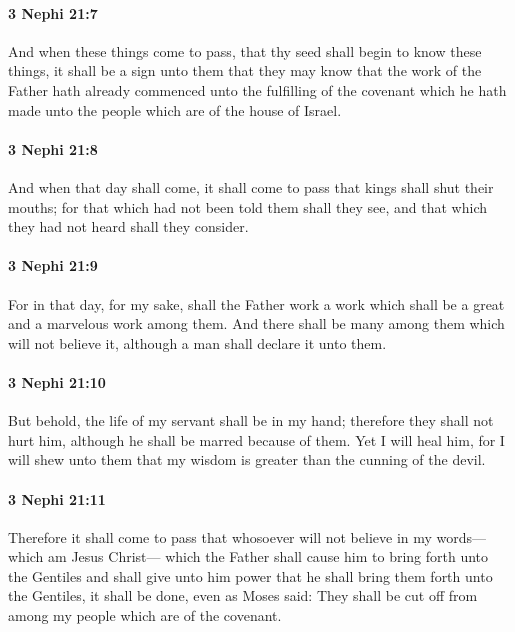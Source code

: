 		\paragraph{3 Nephi 21:7} %
			\label{3NEPHI-21-7}

			And when these things come to pass,
			that thy seed shall begin to know these things,
			it shall be a sign unto them
			that they may know that the work of the Father hath already commenced
			unto the fulfilling of the covenant which he hath made unto the people
			which are of the house of Israel.

		\paragraph{3 Nephi 21:8} %
			\label{3NEPHI-21-8}

			And when that day shall come,
			it shall come to pass that kings shall shut their mouths;
			for that which had not been told them shall they see,
			and that which they had not heard shall they consider.

		\paragraph{3 Nephi 21:9} %
			\label{3NEPHI-21-9}

			For in that day, for my sake, shall the Father work a work
			which shall be a great and a marvelous work among them.
			And there shall be many among them which will not believe it,
			although a man shall declare it unto them.

		\paragraph{3 Nephi 21:10} %
			\label{3NEPHI-21-10}

			But behold, the life of my servant shall be in my hand;
			therefore they shall not hurt him,
			although he shall be marred because of them.
			Yet I will heal him,
			for I will shew unto them that my wisdom is greater
			than the cunning of the devil.

		\paragraph{3 Nephi 21:11} %
			\label{3NEPHI-21-11}

			Therefore it shall come to pass that
			whosoever will not believe in my words---which am Jesus Christ---
			which the Father shall cause him to bring forth unto the Gentiles
			and shall give unto him power that he shall bring them forth unto the Gentiles,
			it shall be done, even as Moses said:
			They shall be cut off from among my people which are of the covenant.

